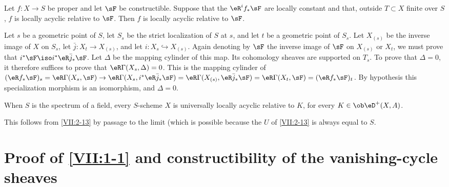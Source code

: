 \documentclass[oneside]{book}
\begin{document}
\begin{lemma_}\label{VII:2-15}
Let $f:X\to S$ be proper and let $\sF$ be constructible. Suppose that the
$\eR^i f_\ast \sF$ are locally constant and that, outside $T\subset X$ finite
over $S$, $f$ is locally acyclic relative to $\sF$. Then $f$ is locally
acyclic relative to $\sF$.
\end{lemma_}

Let $s$ be a geometric point of $S$, let $S_s$ be the strict localization of
$S$ at $s$, and let $t$ be a geometric point of $S_s$. Let $X_{(s)}$ be the
inverse image of $X$ on $S_s$, let $\bar j:X_t \to X_{(s)}$, and let
$i:X_s \hookrightarrow X_{(s)}$. Again denoting by $\sF$ the inverse image of
$\sF$ on $X_{(s)}$ or $X_t$, we must prove that
$i^\ast \sF \iso i^\ast \eR \bar j_\ast \sF$. Let $\Delta$ be the mapping
cylinder of this map. Its cohomology sheaves are supported on $T_s$. To prove
that $\Delta=0$, it therefore suffices to prove that
$\eR\Gamma(X_s,\Delta)=0$. This is the mapping cylinder of
$(\eR f_\ast \sF)_s = \eR\Gamma(X_s,\sF) \to \eR\Gamma(X_s,i^\ast \eR\bar j_\ast \sF) = \eR\Gamma(X_{(s)},\eR\bar j_\ast \sF) = \eR\Gamma(X_t,\sF) = (\eR f_\ast \sF)_t$.
By hypothesis this specialization morphism is an isomorphism, and
$\Delta=0$.





\begin{corollary_}\label{VII:2-16}
When $S$ is the spectrum of a field, every $S$-scheme $X$ is universally
locally acyclic relative to $K$, for every $K\in\ob\eD^+(X,A)$.
\end{corollary_}

This follows from \ref{VII:2-13} by passage to the limit (which is possible
because the $U$ of \ref{VII:2-13} is always equal to $S$.








\section{Proof of \texorpdfstring{\ref{VII:1-1}}{1.1} and constructibility of the vanishing-cycle sheaves}\label{VII:3}






\subsection{}\label{VII:3-1}
\end{document}
